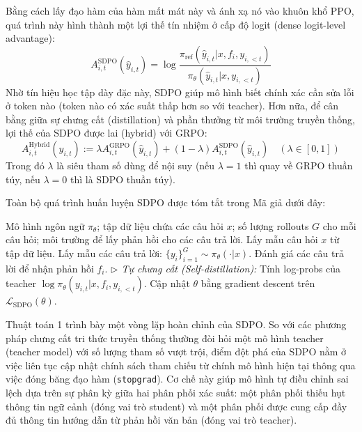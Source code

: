 \documentclass[12pt,a4paper]{report}
\begin{document}
Bằng cách lấy đạo hàm của hàm mất mát này và ánh xạ nó vào khuôn khổ PPO, quá trình này hình thành một lợi thế tín nhiệm ở cấp độ logit (dense logit-level advantage):
\begin{equation}
    A_{i,t}^{\text{SDPO}}(\hat{y}_{i,t}) = \log \frac{\pi_{\text{ref}}(\hat{y}_{i,t} | x, f_i, y_{i,<t})}{\pi_\theta(\hat{y}_{i,t} | x, y_{i,<t})}
\end{equation}
Nhờ tín hiệu học tập dày đặc này, SDPO giúp mô hình biết chính xác cần sửa lỗi ở token nào (token nào có xác suất thấp hơn so với teacher). Hơn nữa, để cân bằng giữa sự chưng cất (distillation) và phần thưởng từ môi trường truyền thống, lợi thế của SDPO được lai (hybrid) với GRPO:
\begin{equation}
    A_{i,t}^{\text{Hybrid}}(\hat{y}_{i,t}) := \lambda A_{i,t}^{\text{GRPO}}(\hat{y}_{i,t}) + (1-\lambda) A_{i,t}^{\text{SDPO}}(\hat{y}_{i,t}) \quad (\lambda \in [0, 1])
\end{equation}
Trong đó $\lambda$ là siêu tham số dùng để nội suy (nếu $\lambda=1$ thì quay về GRPO thuần túy, nếu $\lambda=0$ thì là SDPO thuần túy).

Toàn bộ quá trình huấn luyện SDPO được tóm tắt trong Mã giả dưới đây:

\begin{algorithm}[h!]
\caption{Tối ưu hóa Chính sách Tự chưng cất (SDPO)}
\begin{algorithmic}[1]
\Require Mô hình ngôn ngữ $\pi_\theta$; tập dữ liệu chứa các câu hỏi $x$; số lượng rollouts $G$ cho mỗi câu hỏi; môi trường để lấy phản hồi cho các câu trả lời.
\Repeat
    \State Lấy mẫu câu hỏi $x$ từ tập dữ liệu.
    \State Lấy mẫu các câu trả lời: $\{y_i\}_{i=1}^G \sim \pi_\theta(\cdot | x)$.
    \State Đánh giá các câu trả lời để nhận phản hồi $f_i$.
    \State \textit{$\triangleright$ Tự chưng cất (Self-distillation):}
    \State Tính log-probs của teacher $\log \pi_\theta(y_{i,t} | x, f_i, y_{i,<t})$.
    \State Cập nhật $\theta$ bằng gradient descent trên $\mathcal{L}_{\text{SDPO}}(\theta)$.
\end{algorithmic}
\end{algorithm}

Thuật toán 1 trình bày một vòng lặp hoàn chỉnh của SDPO. So với các phương pháp chưng cất tri thức truyền thống thường đòi hỏi một mô hình teacher (teacher model) với số lượng tham số vượt trội, điểm đột phá của SDPO nằm ở việc liên tục cập nhật chính sách tham chiếu từ chính mô hình hiện tại thông qua việc đóng băng đạo hàm (\texttt{stopgrad}). Cơ chế này giúp mô hình tự điều chỉnh sai lệch dựa trên sự phân kỳ giữa hai phân phối xác suất: một phân phối thiếu hụt thông tin ngữ cảnh (đóng vai trò student) và một phân phối được cung cấp đầy đủ thông tin hướng dẫn từ phản hồi văn bản (đóng vai trò teacher).
\end{document}
